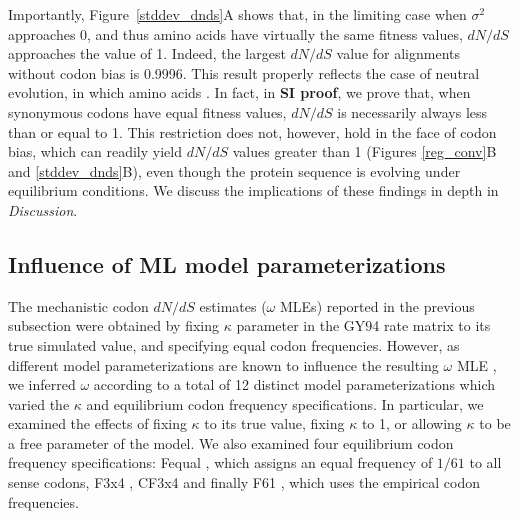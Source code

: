 \documentclass[11pt]{article}
\begin{document}
Importantly, Figure~\ref{stddev_dnds}A shows that, in the limiting case when $\sigma^2$ approaches 0, and thus amino acids have virtually the same fitness values, $dN/dS$ approaches the value of 1. Indeed, the largest $dN/dS$ value for alignments without codon bias is 0.9996. This result properly reflects the case of neutral evolution, in which amino acids . In fact, in \textbf{SI proof}, we prove that, when synonymous codons have equal fitness values, $dN/dS$ is necessarily always less than or equal to 1. This restriction does not, however, hold in the face of codon bias, which can readily yield $dN/dS$ values greater than 1 (Figures \ref{reg_conv}B and \ref{stddev_dnds}B), even though the protein sequence is evolving under equilibrium conditions. We discuss the implications of these findings in depth in \textit{Discussion}.


 \subsection*{Influence of ML model parameterizations}

The mechanistic codon $dN/dS$ estimates ($\omega$ MLEs) reported in the previous subsection were obtained by fixing $\kappa$ parameter in the GY94 rate matrix to its true simulated value, and specifying equal codon frequencies. However, as different model parameterizations are known to influence the resulting $\omega$ MLE \cite{YN00,Yang2006,ZhangYu2006}, we inferred $\omega$ according to a total of 12 distinct model parameterizations which varied the $\kappa$ and equilibrium codon frequency specifications. In particular, we examined the effects of fixing $\kappa$ to its true value, fixing $\kappa$ to 1, or allowing $\kappa$ to be a free parameter of the model. We also examined four equilibrium codon frequency specifications: Fequal \cite{YN00, Yang2006}, which assigns an equal frequency of $1/61$ to all sense codons, F3x4 \cite{MuseGaut1994}, CF3x4 \cite{Pond2010} and finally F61 \cite{GoldmanYang1994, YN00, YAng2006}, which uses the empirical codon frequencies.
\end{document}
